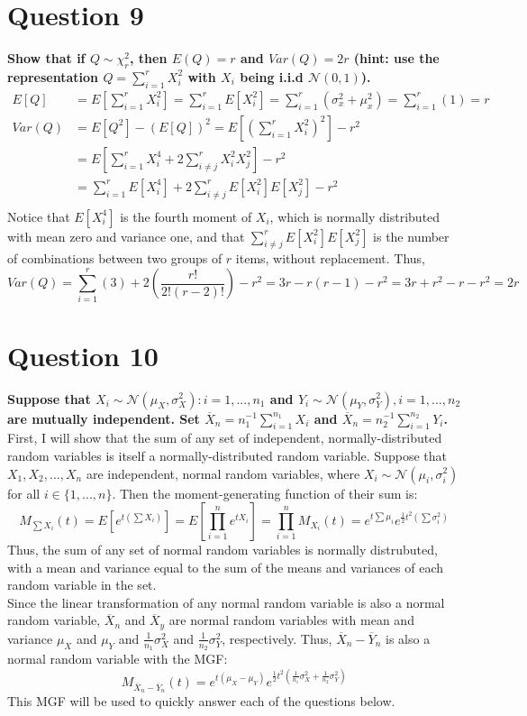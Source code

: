 \documentclass{article}
\newcommand{\N}{\mathcal{N}}
\newcommand{\olx}[1]{\overline{X}_{#1}}
\begin{document}
\section*{Question 9}
\textbf{Show that if $Q\sim \chi^2_r$, then $E(Q)=r$ and $Var(Q)=2r$ (hint: use the representation $Q=\sum_{i=1}^r X_i^2$ with $X_i$ being i.i.d $\N(0,1)$).}
\begin{align*}
	E[Q]	&= E\left[\sum_{i=1}^r X_i^2\right] = \sum_{i=1}^r E[X_i^2] = \sum_{i=1}^r(\sigma_x^2 + \mu_x^2) = \sum_{i=1}^r(1) = r	\\
	Var(Q)	&= E[Q^2] - \left(E[Q]\right)^2 = E\left[\left(\sum_{i=1}^rX_i^2\right)^2\right] - r^2	\\
			&= E\left[\sum_{i=1}^rX_i^4 + 2\sum_{i\neq j}^r X_i^2X_j^2\right] - r^2	\\
			&= \sum_{i=1}^rE\left[X_i^4\right] + 2\sum_{i\neq j}^rE[X_i^2]E[X_j^2] - r^2 \\
\end{align*}
Notice that $E\left[X_i^4\right]$ is the fourth moment of $X_i$, which is normally distributed with mean zero and variance one, and that $\sum_{i\neq j}^rE[X_i^2]E[X_j^2]$ is the number of combinations between two groups of $r$ items, without replacement. Thus,
\[
	Var(Q) = \sum_{i=1}^r(3) + 2\left(\frac{r!}{2!(r-2)!}\right) - r^2 = 3r-r(r-1)-r^2 = 3r+r^2-r-r^2 = 2r
\]


\section*{Question 10}
\textbf{Suppose that $X_i\sim\N(\mu_X,\sigma^2_X):i=1,...,n_1$ and $Y_i\sim\N(\mu_Y,\sigma_Y^2),i=1,...,n_2$ are mutually independent. Set $\overline{X}_n=n_1^{-1}\sum_{i=1}^{n_1}X_i$ and $\overline{X}_n=n_2^{-1}\sum_{i=1}^{n_2}Y_i$.}
\bigskip \\
First, I will show that the sum of any set of independent, normally-distributed random variables is itself a normally-distributed random variable. Suppose that $X_1,X_2,...,X_n$ are independent, normal random variables, where $X_i\sim\N(\mu_i,\sigma^2_i)$ for all $i\in\{1,...,n\}$. Then the moment-generating function of their sum is:
\[
	M_{\sum X_i}(t) = E\left[e^{t(\sum X_i)}\right] = E\left[\prod_{i=1}^n e^{tX_i}\right] = \prod_{i=1}^n M_{X_i}(t) 
	= e^{t\sum\mu_i}e^{\frac{1}{2}t^2(\sum\sigma_i^2)}
\]
Thus, the sum of any set of normal random variables is normally distrubuted, with a mean and variance equal to the sum of the means and variances of each random variable in the set.
\smallskip \\
Since the linear transformation of any normal random variable is also a normal random variable, $\olx{n}$ and $\olx{y}$ are normal random variables with mean and variance $\mu_X$ and $\mu_Y$ and $\frac{1}{n_1}\sigma_X^2$ and $\frac{1}{n_2}\sigma_Y^2$, respectively. Thus, $\overline{X}_n-\overline{Y}_n$ is also a normal random variable with the MGF:
\[
	M_{\overline{X}_n-\overline{Y}_n}(t) = e^{t(\mu_X-\mu_Y)}e^{\frac{1}{2}t^2(\frac{1}{n_1}\sigma_X^2+\frac{1}{n_2}\sigma_Y^2)}
\]
This MGF will be used to quickly answer each of the questions below.
\end{document}
